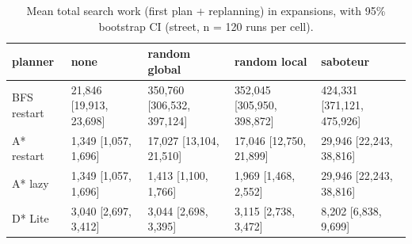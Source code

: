 \begin{table}[t]
\centering
\small
\caption{Mean total search work (first plan + replanning) in expansions, with 95\% bootstrap CI (street, n = 120 runs per cell).}
\label{tab:total-street}
\begin{tabular}{lllll}
\toprule
planner & none & random global & random local & saboteur \\
\midrule
BFS restart & 21,846 [19,913, 23,698] & 350,760 [306,532, 397,124] & 352,045 [305,950, 398,872] & 424,331 [371,121, 475,926] \\
A* restart & 1,349 [1,057, 1,696] & 17,027 [13,104, 21,510] & 17,046 [12,750, 21,899] & 29,946 [22,243, 38,816] \\
A* lazy & 1,349 [1,057, 1,696] & 1,413 [1,100, 1,766] & 1,969 [1,468, 2,552] & 29,946 [22,243, 38,816] \\
D* Lite & 3,040 [2,697, 3,412] & 3,044 [2,698, 3,395] & 3,115 [2,738, 3,472] & 8,202 [6,838, 9,699] \\
\bottomrule
\end{tabular}
\end{table}
